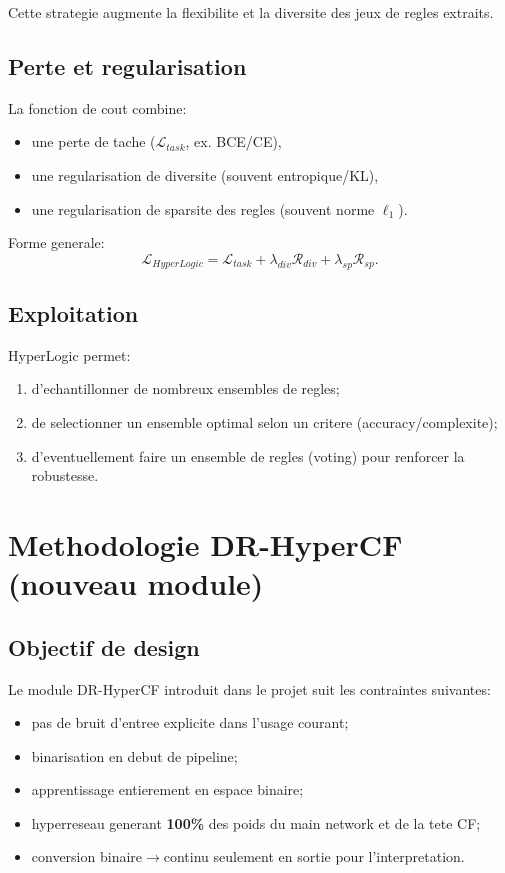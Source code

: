 \documentclass[11pt,a4paper]{article}
\begin{document}
Cette strategie augmente la flexibilite et la diversite des jeux de regles extraits.

\subsection{Perte et regularisation}
La fonction de cout combine:
\begin{itemize}
    \item une perte de tache ($\mathcal{L}_{task}$, ex. BCE/CE),
    \item une regularisation de diversite (souvent entropique/KL),
    \item une regularisation de sparsite des regles (souvent norme $\ell_1$).
\end{itemize}

Forme generale:
\begin{equation}
\mathcal{L}_{HyperLogic}
= \mathcal{L}_{task}
+ \lambda_{div}\mathcal{R}_{div}
+ \lambda_{sp}\mathcal{R}_{sp}.
\end{equation}

\subsection{Exploitation}
HyperLogic permet:
\begin{enumerate}
    \item d'echantillonner de nombreux ensembles de regles;
    \item de selectionner un ensemble optimal selon un critere (accuracy/complexite);
    \item d'eventuellement faire un ensemble de regles (voting) pour renforcer la robustesse.
\end{enumerate}

\section{Methodologie DR-HyperCF (nouveau module)}
\subsection{Objectif de design}
Le module DR-HyperCF introduit dans le projet suit les contraintes suivantes:
\begin{itemize}
    \item pas de bruit d'entree explicite dans l'usage courant;
    \item binarisation en debut de pipeline;
    \item apprentissage entierement en espace binaire;
    \item hyperreseau generant \textbf{100\%} des poids du main network et de la tete CF;
    \item conversion binaire$\rightarrow$continu seulement en sortie pour l'interpretation.
\end{itemize}
\end{document}
